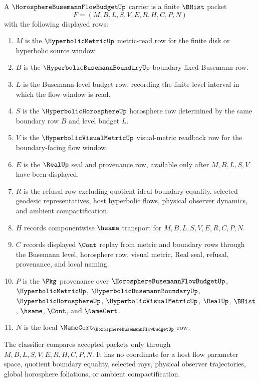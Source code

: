 \begin{definition}
\label{def:horosphere-busemann-flow-budget-carrier}
A $\HorosphereBusemannFlowBudgetUp$ carrier is a finite $\BHist$ packet
$$
F=(M,B,L,S,V,E,R,H,C,P,N)
$$
with the following displayed rows:
\begin{enumerate}
\item $M$ is the $\HyperbolicMetricUp$ metric-read row for the finite disk or hyperbolic source window.
\item $B$ is the $\HyperbolicBusemannBoundaryUp$ boundary-fixed Busemann row.
\item $L$ is the Busemann-level budget row, recording the finite level interval in which the flow window is read.
\item $S$ is the $\HyperbolicHorosphereUp$ horosphere row determined by the same boundary row $B$ and level budget $L$.
\item $V$ is the $\HyperbolicVisualMetricUp$ visual-metric readback row for the boundary-facing flow window.
\item $E$ is the $\RealUp$ seal and provenance row, available only after $M,B,L,S,V$ have been displayed.
\item $R$ is the refusal row excluding quotient ideal-boundary equality, selected geodesic representatives, host hyperbolic flows, physical observer dynamics, and ambient compactification.
\item $H$ records componentwise $\hsame$ transport for $M,B,L,S,V,E,R,C,P,N$.
\item $C$ records displayed $\Cont$ replay from metric and boundary rows through the Busemann level, horosphere row, visual metric, Real seal, refusal, provenance, and local naming.
\item $P$ is the $\Pkg$ provenance over $\HorosphereBusemannFlowBudgetUp$, $\HyperbolicMetricUp$, $\HyperbolicBusemannBoundaryUp$, $\HyperbolicHorosphereUp$, $\HyperbolicVisualMetricUp$, $\RealUp$, $\BHist$, $\hsame$, $\Cont$, and $\NameCert$.
\item $N$ is the local $\NameCert_{\HorosphereBusemannFlowBudgetUp}$ row.
\end{enumerate}
The classifier compares accepted packets only through $M,B,L,S,V,E,R,H,C,P,N$. It has no coordinate for a host flow parameter space, quotient boundary equality, selected rays, physical observer trajectories, global horosphere foliations, or ambient compactification.
\end{definition}

